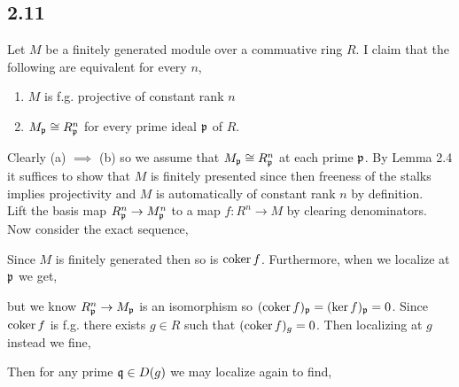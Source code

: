 \documentclass[12pt]{article}
\begin{document}
\subsection{2.11}

Let $M$ be a finitely generated module over a commuative ring $R$. I claim that the following are equivalent for every $n$,
\begin{enumerate}
\item $M$ is f.g. projective of constant rank $n$
\item $M_{\mathfrak{p}} \cong R^n_{\mathfrak{p}}$ for every prime ideal $\mathfrak{p}$ of $R$.
\end{enumerate}
Clearly (a) $\implies$ (b) so we assume that $M_{\mathfrak{p}} \cong R^n_{\mathfrak{p}}$ at each prime $\mathfrak{p}$. By Lemma 2.4 it suffices to show that $M$ is finitely presented since then freeness of the stalks implies projectivity and $M$ is automatically of constant rank $n$ by definition. 
\bigskip\\
Lift the basis map $R_{\mathfrak{p}}^n \to M_{\mathfrak{p}}^n$ to a map $f : R^n \to M$ by clearing denominators. Now consider the exact sequence,
\begin{center}
\end{center}
Since $M$ is finitely generated then so is $\operatorname{\mathrm{coker}}{f}$. Furthermore, when we localize at $\mathfrak{p}$ we get,
\begin{center}
\end{center}
but we know $R^n_{\mathfrak{p}} \to M_{\mathfrak{p}}$ is an isomorphism so $(\operatorname{\mathrm{coker}}{f})_{\mathfrak{p}} = (\ker{f})_{\mathfrak{p}} = 0$. Since $\operatorname{\mathrm{coker}}{f}$ is f.g. there exists $g \in R$ such that $(\operatorname{\mathrm{coker}}{f})_g = 0$. Then localizing at $g$ instead we fine,
\begin{center}
\end{center}
Then for any prime $\mathfrak{q} \in D(g)$ we may localize again to find,
\begin{center}
\end{center}
\end{document}
